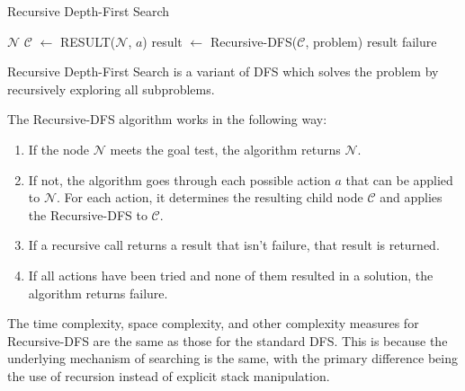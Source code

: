 \documentclass[a4paper,UKenglish,cleveref, autoref, thm-restate]{qlinhta}
\begin{document}
\begin{algorithm}[H]
\caption{Recursive Depth-First Search}\label{alg:recursive_dfs}
\begin{algorithmic}[1]
        \State \Return $\mathcal{N}$
    \Else
            \State $\mathcal{C}$ $\gets$ RESULT($\mathcal{N}$, $a$)
            \State result $\gets$ Recursive-DFS($\mathcal{C}$, problem)
                \State \Return result
            \EndIf
        \EndFor
    \EndIf
    \State \Return failure
\EndFunction
\end{algorithmic}
\end{algorithm}
Recursive Depth-First Search is a variant of DFS which solves the problem by recursively exploring all subproblems.

The Recursive-DFS algorithm works in the following way:
\begin{enumerate}
    \item If the node $\mathcal{N}$ meets the goal test, the algorithm returns $\mathcal{N}$.
    \item If not, the algorithm goes through each possible action $a$ that can be applied to $\mathcal{N}$. For each action, it determines the resulting child node $\mathcal{C}$ and applies the Recursive-DFS to $\mathcal{C}$.
    \item If a recursive call returns a result that isn't failure, that result is returned.
    \item If all actions have been tried and none of them resulted in a solution, the algorithm returns failure.
\end{enumerate}

The time complexity, space complexity, and other complexity measures for Recursive-DFS are the same as those for the standard DFS. This is because the underlying mechanism of searching is the same, with the primary difference being the use of recursion instead of explicit stack manipulation.
\end{document}
